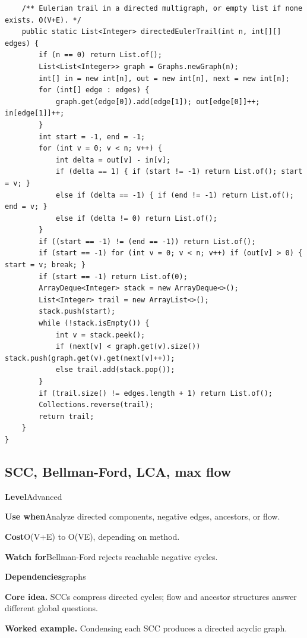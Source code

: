 \documentclass[10pt,letterpaper]{article}
\newcommand{\entrylabel}[1]{\textcolor{accent}{\bfseries #1}}
\begin{document}
\begin{lstlisting}
    /** Eulerian trail in a directed multigraph, or empty list if none exists. O(V+E). */
    public static List<Integer> directedEulerTrail(int n, int[][] edges) {
        if (n == 0) return List.of();
        List<List<Integer>> graph = Graphs.newGraph(n);
        int[] in = new int[n], out = new int[n], next = new int[n];
        for (int[] edge : edges) {
            graph.get(edge[0]).add(edge[1]); out[edge[0]]++; in[edge[1]]++;
        }
        int start = -1, end = -1;
        for (int v = 0; v < n; v++) {
            int delta = out[v] - in[v];
            if (delta == 1) { if (start != -1) return List.of(); start = v; }
            else if (delta == -1) { if (end != -1) return List.of(); end = v; }
            else if (delta != 0) return List.of();
        }
        if ((start == -1) != (end == -1)) return List.of();
        if (start == -1) for (int v = 0; v < n; v++) if (out[v] > 0) { start = v; break; }
        if (start == -1) return List.of(0);
        ArrayDeque<Integer> stack = new ArrayDeque<>();
        List<Integer> trail = new ArrayList<>();
        stack.push(start);
        while (!stack.isEmpty()) {
            int v = stack.peek();
            if (next[v] < graph.get(v).size()) stack.push(graph.get(v).get(next[v]++));
            else trail.add(stack.pop());
        }
        if (trail.size() != edges.length + 1) return List.of();
        Collections.reverse(trail);
        return trail;
    }
}
\end{lstlisting}
\subsection{SCC, Bellman-Ford, LCA, max flow}
\begin{guidebox}\small
\entrylabel{Level}\quad Advanced\par
\entrylabel{Use when}\quad Analyze directed components, negative edges, ancestors, or flow.\par
\entrylabel{Cost}\quad O(V+E) to O(VE), depending on method.\par
\entrylabel{Watch for}\quad Bellman-Ford rejects reachable negative cycles.\par
\entrylabel{Dependencies}\quad graphs\par
\end{guidebox}
\noindent\textbf{Core idea.} SCCs compress directed cycles; flow and ancestor structures answer different global questions.\par
\noindent\textbf{Worked example.} Condensing each SCC produces a directed acyclic graph.\par
\end{document}
